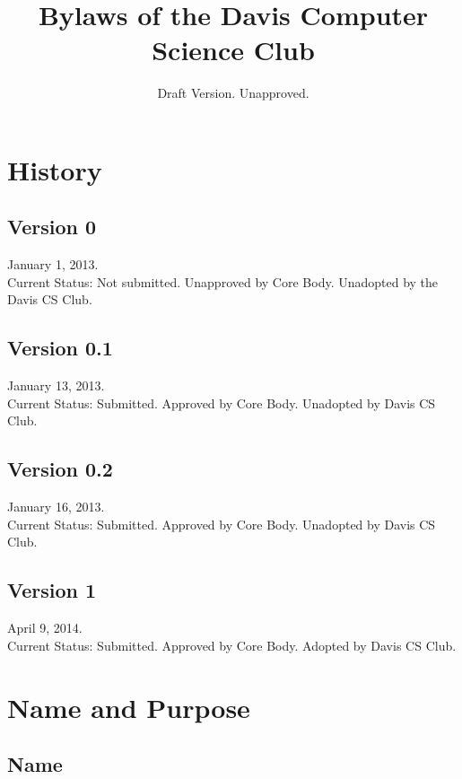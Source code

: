 \documentclass{article}
\title{Bylaws of the Davis Computer Science Club}
\author{}
\date{Draft Version. Unapproved.}
\begin{document}

\begin{titlepage}
	\maketitle
\end{titlepage}

\pagebreak

\section*{History}
\subsection*{Version 0}
January 1, 2013.\\
Current Status: Not submitted. Unapproved by Core Body. Unadopted by the Davis CS Club.
\subsection*{Version 0.1}
January 13, 2013.\\
Current Status: Submitted. Approved by Core Body. Unadopted by Davis CS Club.
\subsection*{Version 0.2}
January 16, 2013.\\
Current Status: Submitted. Approved by Core Body. Unadopted by Davis CS Club.
\subsection*{Version 1}
April 9, 2014.\\
Current Status: Submitted. Approved by Core Body. Adopted by Davis CS Club.

\pagebreak

\tableofcontents

\pagebreak

\singlespacing
\sectionfont{\Large}
\subsectionfont{\large}

\section{Name and Purpose}

\subsection{Name}
\end{document}
